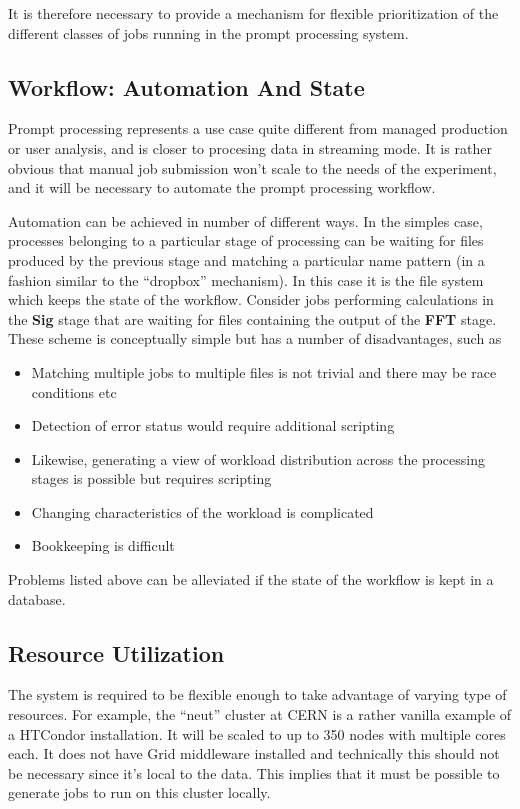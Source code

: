 \documentclass[pdftex,12pt,letter]{article}
\begin{document}
It is therefore necessary to provide a mechanism for flexible prioritization of the different
classes of jobs running in the prompt processing system.



\subsection{Workflow: Automation And State}

Prompt processing represents a use case quite different from managed production or user analysis, and is closer to
procesing data in streaming mode. It is rather obvious that manual job submission won't scale to the needs
of the experiment, and it will be necessary to automate the prompt processing workflow.

Automation can be achieved in  number of different ways. In the simples case, processes belonging to a particular stage of processing
can be waiting for files produced by the previous
stage and matching a particular name pattern (in a fashion similar to the ``dropbox'' mechanism). In this case it is the file
system which keeps the state of the workflow. Consider jobs performing calculations in the \textbf{Sig} stage that are waiting for
files containing the output of the \textbf{FFT} stage.
These scheme is conceptually simple but has a number of disadvantages, such as
\begin{itemize}
\item Matching multiple jobs to multiple files is not trivial and there may be race conditions etc
\item Detection of error status would require additional scripting
\item Likewise, generating a view of workload distribution across the processing stages is possible but requires
scripting
\item Changing characteristics of the workload is complicated
\item Bookkeeping is difficult
\end{itemize}

\noindent Problems listed above can be alleviated if the state of the workflow is kept in a database.

\subsection{Resource Utilization}
The system is required to be flexible enough to take advantage of varying type of resources. For example, the ``neut'' cluster at CERN
is a rather vanilla example of a HTCondor installation. It will be scaled to up to 350 nodes with multiple cores each. It does not have Grid middleware
installed and technically this should not be necessary since it's local to the data. This implies that it must be possible to generate jobs to
run on this cluster locally.
\end{document}
